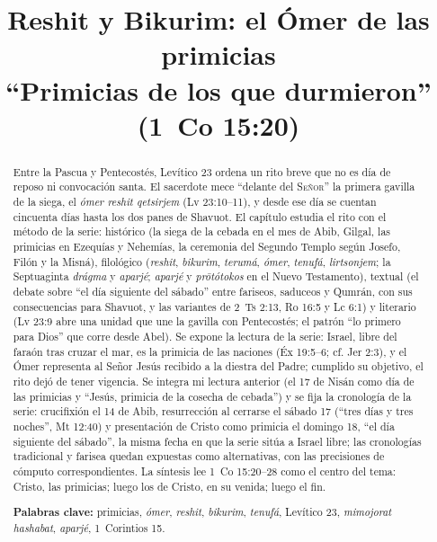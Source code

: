 \documentclass[11pt,letterpaper]{article}
\title{\color{tierraroja}\bfseries Reshit y Bikurim: el Ómer de las primicias\\[4pt]\large\color{sepia}\mdseries ``Primicias de los que durmieron'' (1~Co 15:20)}
\author{}\date{}
\newcommand{\SENOR}{\textsc{Señor}}
\begin{document}
\maketitle\thispagestyle{empty}

\begin{abstract}\noindent
Entre la Pascua y Pentecostés, Levítico 23 ordena un rito breve que no es día de reposo ni convocación santa. El sacerdote mece ``delante del \SENOR'' la primera gavilla de la siega, el \emph{ómer reshit qetsirjem} (Lv 23:10--11), y desde ese día se cuentan cincuenta días hasta los dos panes de Shavuot. El capítulo estudia el rito con el método de la serie: histórico (la siega de la cebada en el mes de Abib, Gilgal, las primicias en Ezequías y Nehemías, la ceremonia del Segundo Templo según Josefo, Filón y la Misná), filológico (\emph{reshit}, \emph{bikurim}, \emph{terumá}, \emph{ómer}, \emph{tenufá}, \emph{lirtsonjem}; la Septuaginta \emph{drágma} y \emph{aparjé}; \emph{aparjé} y \emph{prōtótokos} en el Nuevo Testamento), textual (el debate sobre ``el día siguiente del sábado'' entre fariseos, saduceos y Qumrán, con sus consecuencias para Shavuot, y las variantes de 2~Ts 2:13, Ro 16:5 y Lc 6:1) y literario (Lv 23:9 abre una unidad que une la gavilla con Pentecostés; el patrón ``lo primero para Dios'' que corre desde Abel). Se expone la lectura de la serie: Israel, libre del faraón tras cruzar el mar, es la primicia de las naciones (Éx 19:5--6; cf. Jer 2:3), y el Ómer representa al Señor Jesús recibido a la diestra del Padre; cumplido su objetivo, el rito dejó de tener vigencia. Se integra mi lectura anterior (el 17 de Nisán como día de las primicias y ``Jesús, primicia de la cosecha de cebada'') y se fija la cronología de la serie: crucifixión el 14 de Abib, resurrección al cerrarse el sábado 17 (``tres días y tres noches'', Mt 12:40) y presentación de Cristo como primicia el domingo 18, ``el día siguiente del sábado'', la misma fecha en que la serie sitúa a Israel libre; las cronologías tradicional y farisea quedan expuestas como alternativas, con las precisiones de cómputo correspondientes. La síntesis lee 1~Co 15:20--28 como el centro del tema: Cristo, las primicias; luego los de Cristo, en su venida; luego el fin.
\par\smallskip\noindent\textbf{Palabras clave:} primicias, \emph{ómer}, \emph{reshit}, \emph{bikurim}, \emph{tenufá}, Levítico 23, \emph{mimojorat hashabat}, \emph{aparjé}, 1~Corintios 15.\end{abstract}
\end{document}
